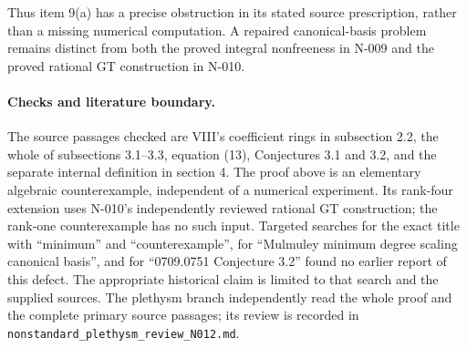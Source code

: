 Thus item 9(a) has a precise obstruction in its stated source
prescription, rather than a missing numerical computation.  A
repaired canonical-basis problem remains distinct from both the
proved integral nonfreeness in N-009 and the proved rational GT
construction in N-010.

\paragraph{Checks and literature boundary.}
The source passages checked are VIII's coefficient rings in
subsection 2.2, the whole of subsections 3.1--3.3, equation (13),
Conjectures 3.1 and 3.2, and the separate internal definition in
section 4.  The proof above is an elementary algebraic
counterexample, independent of a numerical experiment.  Its
rank-four extension uses N-010's independently reviewed rational
GT construction; the rank-one counterexample has no such input.
Targeted searches for the exact title with ``minimum'' and
``counterexample'', for ``Mulmuley minimum degree scaling canonical
basis'', and for ``0709.0751 Conjecture 3.2'' found no earlier report
of this defect.  The appropriate historical claim is limited to that
search and the supplied sources.  The plethysm branch independently
read the whole proof and the complete primary source passages;
its review is recorded in
\nolinkurl{nonstandard_plethysm_review_N012.md}.

